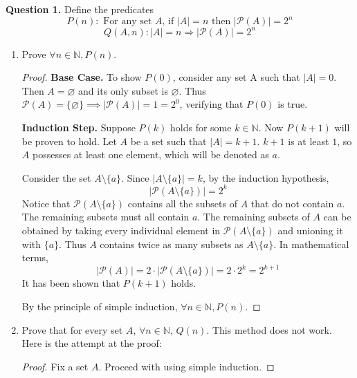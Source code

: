 \documentclass[11pt]{article}
\begin{document}
    \noindent\textbf{Question 1.} Define the predicates
    \[
        P(n)\colon \text{ For any set } A\text{, if } |A|=n \text{ then } |\mathcal{P}(A)|=2^n
    \]
    \[
        Q(A,n)\colon |A|=n \Longrightarrow |\mathcal{P}(A)|=2^n
    \]
    \begin{enumerate}[label=\alph*)]
        \item Prove \(\forall n \in \mathbb{N} , P(n)\).
        \begin{proof}
            \noindent\textbf{Base Case.} To show \(P(0)\), consider any set A such that \(\left\vert A \right\vert = 0\). Then \(A = \varnothing \) and its only subset is \(\varnothing\). Thus \(\mathcal{P} (A) = \{\varnothing\} \implies \left\vert \mathcal{P}(A) \right\vert = 1 = 2^0\), verifying that \(P(0)\) is true.

            \noindent\textbf{Induction Step.} Suppose \(P(k)\) holds for some \(k \in \mathbb{N} \). Now \(P(k+1)\) will be proven to hold. Let \(A\) be a set such that \(\left\vert A \right\vert = k+1\). \(k+1\) is at least \(1\), so \(A\) possesses at least one element, which will be denoted as \(a\).
            
            Consider the set \(A\setminus \{ a \} \). Since \(\bigl\vert A\setminus\{a\}\bigr\vert = k \), by the induction hypothesis,
            \[
                \bigl\vert\mathcal{P}(A\setminus\{a\})\bigr\vert = 2^k
            \]
            Notice that \(\mathcal{P}(A\setminus\{a\})\) contains all the subsets of \(A\) that do not contain \(a\). The remaining subsets must all contain \(a\). The remaining subsets of \(A\) can be obtained by taking every individual element in \(\mathcal{P}(A\setminus\{a\})\) and unioning it with \(\{a\}\). Thus \(A\) contains twice as many subsets as \(A\setminus \{a\}\). In mathematical terms, 
            \[
                \left\vert \mathcal{P}(A) \right\vert = 2 \cdot \left\vert \mathcal{P}(A\setminus\{a\}) \right\vert = 2 \cdot 2^k = 2^{k+1} 
            \]
            It has been shown that \(P(k+1)\) holds.

            \noindent By the principle of simple induction, \(\forall n \in \mathbb{N} , P(n)\). 

        \end{proof}
        \item  Prove that for every set \(A\), \(\forall n \in \mathbb{N} \text{, } Q(n)\).
        This method does not work. Here is the attempt at the proof:
        \begin{proof}
            Fix a set \(A\). Proceed with using simple induction.


\end{proof}
\end{enumerate}
\end{document}
